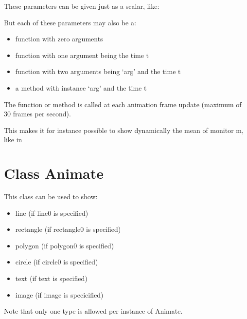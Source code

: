 \documentclass[letterpaper,10pt,english]{sphinxmanual}
\begin{document}
These parameters can be given just as a scalar, like:


But each of these parameters may also be a:
\begin{itemize}
\item {} 
function with zero arguments

\item {} 
function with one argument being the time t

\item {} 
function with two arguments being ‘arg’ and the time t

\item {} 
a method with instance ‘arg’ and the time t

\end{itemize}

The function or method is called at each animation frame update (maximum of 30 frames per second).

This makes it for instance possible to show dynamically the mean of monitor m, like in



\section{Class Animate}
\label{\detokenize{Animation:class-animate}}
This class can be used to show:
\begin{itemize}
\item {} 
line (if line0 is specified)

\item {} 
rectangle (if rectangle0 is specified)

\item {} 
polygon (if polygon0 is specified)

\item {} 
circle (if circle0 is specified)

\item {} 
text (if text is specified)

\item {} 
image (if image is specicified)

\end{itemize}

Note that only one type is allowed per instance of Animate.
\end{document}
